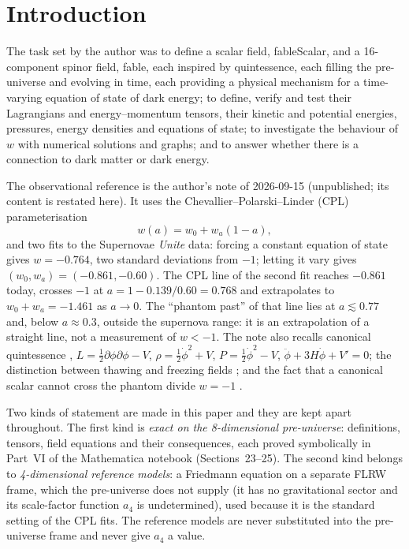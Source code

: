 \documentclass[11pt,a4paper]{article}
\newcommand{\fableScalar}{\textsf{fableScalar}}
\newcommand{\fable}{\textsf{fable}}
\newcommand{\file}[1]{\path{#1}}
\begin{document}
\tableofcontents

\section{Introduction}\label{sec:intro}

The task set by the author was to define a scalar field, \fableScalar{}, and a 16-component
spinor field, \fable{}, each inspired by quintessence, each filling the pre-universe and evolving
in time, each providing a physical mechanism for a time-varying equation of state of dark energy;
to define, verify and test their Lagrangians and energy--momentum tensors, their kinetic and
potential energies, pressures, energy densities and equations of state; to investigate the
behaviour of $w$ with numerical solutions and graphs; and to answer whether there is a connection
to dark matter or dark energy.

The observational reference is the author's note of 2026-09-15 (unpublished; its content is
restated here). It uses the Chevallier--Polarski--Linder (CPL) parameterisation
\cite{Chevallier2001,Linder2003}
\begin{equation}\label{eq:cpl}
  w(a)=w_0+w_a(1-a),
\end{equation}
and two fits to the Supernovae \emph{Unite} data: forcing a constant equation of state gives
$w=-0.764$, two standard deviations from $-1$; letting it vary gives
$(w_0,w_a)=(-0.861,-0.60)$. The CPL line of the second fit reaches $-0.861$ today, crosses $-1$ at
$a=1-0.139/0.60=0.768$ and extrapolates to $w_0+w_a=-1.461$ as $a\to0$. The ``phantom past'' of
that line lies at $a\lesssim0.77$ and, below $a\approx0.3$, outside the supernova range: it is an
extrapolation of a straight line, not a measurement of $w<-1$. The note also recalls canonical
quintessence \cite{Ratra1988,Wetterich1988,Caldwell1998}, $L=\tfrac12\partial\phi\partial\phi-V$,
$\rho=\tfrac12\dot\phi^2+V$, $P=\tfrac12\dot\phi^2-V$, $\ddot\phi+3H\dot\phi+V'=0$; the distinction
between thawing and freezing fields \cite{Caldwell2005}; and the fact that a canonical scalar
cannot cross the phantom divide $w=-1$ \cite{Caldwell2002,Vikman2005}.

Two kinds of statement are made in this paper and they are kept apart throughout. The first kind
is \emph{exact on the 8-dimensional pre-universe}: definitions, tensors, field equations and their
consequences, each proved symbolically in Part~VI of the Mathematica notebook
\file{claude-fable/claude-fable_Einstein-Rosen-2-Planes.nb} (Sections~23--25). The second kind
belongs to \emph{4-dimensional reference models}: a Friedmann equation on a separate FLRW frame,
which the pre-universe does not supply (it has no gravitational sector and its scale-factor
function $a_4$ is undetermined), used because it is the standard setting of the CPL fits. The
reference models are never substituted into the pre-universe frame and never give $a_4$ a value.
\end{document}
